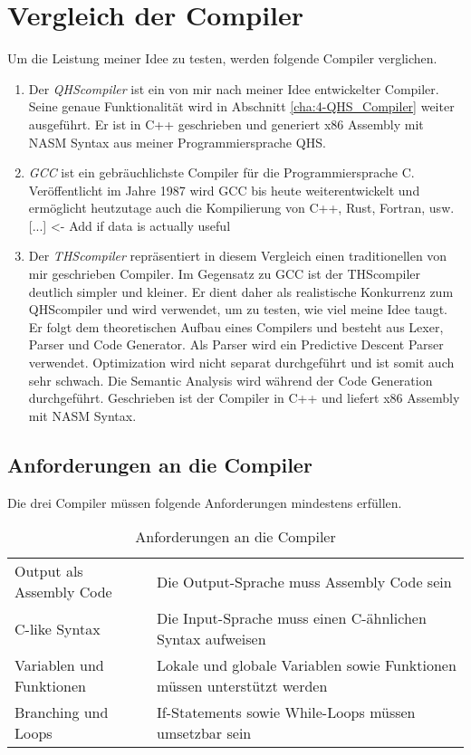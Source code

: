 \chapter{Vergleich der Compiler} \label{cha:2-Vergleich}
Um die Leistung meiner Idee zu testen, werden folgende Compiler verglichen.

\begin{enumerate}
\item
Der \textit{QHScompiler} ist ein von mir nach meiner Idee entwickelter Compiler. Seine genaue Funktionalität wird in Abschnitt \ref{cha:4-QHS_Compiler} weiter ausgeführt.
Er ist in C++ geschrieben und generiert x86 Assembly mit NASM Syntax aus meiner Programmiersprache QHS.

\item
\textit{GCC} ist ein gebräuchlichste Compiler für die Programmiersprache C. Veröffentlicht im Jahre 1987 wird GCC bis heute weiterentwickelt und ermöglicht heutzutage auch die Kompilierung von C++, Rust, Fortran, usw.
[...] <- Add if data is actually useful

\item
Der \textit{THScompiler} repräsentiert in diesem Vergleich einen traditionellen von mir geschrieben Compiler. Im Gegensatz zu GCC ist der THScompiler deutlich simpler und kleiner.
Er dient daher als realistische Konkurrenz zum QHScompiler und wird verwendet, um zu testen, wie viel meine Idee taugt. Er folgt dem theoretischen Aufbau eines Compilers und besteht aus Lexer, Parser und Code Generator.
Als Parser wird ein Predictive Descent Parser verwendet. Optimization wird nicht separat durchgeführt und ist somit auch sehr schwach.
Die Semantic Analysis wird während der Code Generation durchgeführt. Geschrieben ist der Compiler in C++ und liefert x86 Assembly mit NASM Syntax.
\end{enumerate}

\section{Anforderungen an die Compiler}
Die drei Compiler müssen folgende Anforderungen mindestens erfüllen.

\begin{table}[H]
    \centering
    \caption{Anforderungen an die Compiler}
    \vspace{3mm} %
    
    \begin{tabular}{l|l}
    Output als Assembly Code        & Die Output-Sprache muss Assembly Code sein                               \\
    C-like Syntax                   & Die Input-Sprache muss einen C-ähnlichen Syntax aufweisen                \\
    Variablen und Funktionen        & Lokale und globale Variablen sowie Funktionen müssen unterstützt werden  \\
    Branching und Loops             & If-Statements sowie While-Loops müssen umsetzbar sein
    \end{tabular}
\end{table}


